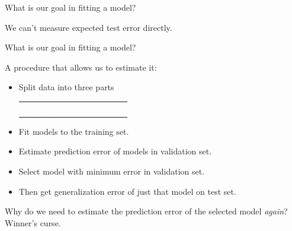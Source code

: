 \documentclass[xcolor={table}, handout]{beamer}
\begin{document}
\begin{frame}{What is our goal in fitting a model?}

\begin{wideitemize}
\item We can't measure expected test error directly. 
\end{wideitemize}

\end{frame}



\begin{frame}{What is our goal in fitting a model?}

\begin{wideitemize}
\item A procedure that allows us to estimate it:
\begin{itemize}
\item Split data into three parts
\begin{table}[]
\renewcommand{\arraystretch}{2.5}
\begin{tabular}{>{\centering\arraybackslash}p{5cm}|>{\centering\arraybackslash}p{2.5cm}|>{\centering\arraybackslash}p{2.5cm} }
\cellcolor{Contrast1l} \textcolor{white}{Training} & \cellcolor{Contrast4l} \textcolor{white}{Validation} & \cellcolor{Contrast6l} \textcolor{white}{Test} 
\end{tabular}
\end{table}
\pause
\item Fit models to the training set. \pause
\item Estimate prediction error of models in validation set. \pause
\item Select model with minimum error in validation set.\pause
\item Then get generalization error of just that model on test set. \pause
\end{itemize}
\item Why do we need to estimate the prediction error of the selected model \textit{again}? \pause Winner's curse. 
\end{wideitemize}

\end{frame}
\end{document}
